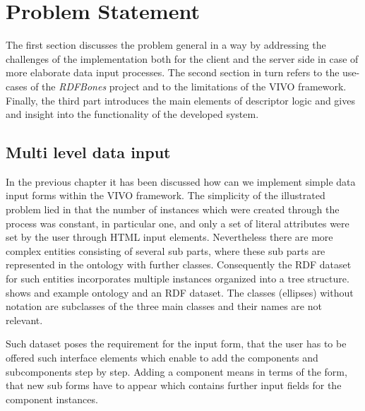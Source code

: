 \chapter{Problem Statement}

The first section discusses the problem general in a way by addressing the challenges of the implementation both for the client and the server side in case of more elaborate data input processes. The second section in turn refers to the use-cases of the \textit{RDFBones} project and to the limitations of the VIVO framework. Finally, the third part introduces the main elements of descriptor logic and gives and insight into the functionality of the developed system. 

\section{Multi level data input}

In the previous chapter it has been discussed how can we implement simple data input forms within the VIVO framework. The simplicity of the illustrated problem lied in that the number of instances which were created through the process was constant, in particular one, and only a set of literal attributes were set by the user through HTML input elements. Nevertheless there are more complex entities consisting of several sub parts, where these sub parts are represented in the ontology with further classes. Consequently the RDF dataset for such entities incorporates multiple instances organized into a tree structure.  shows and example ontology and an RDF dataset. The classes (ellipses) without notation are subclasses of the three main classes and their names are not relevant.


Such dataset poses the requirement for the input form, that the user has to be offered such interface elements which enable to add the components and subcomponents step by step. Adding a component means in terms of the form, that new sub forms have to appear which contains further input fields for the component instances.


